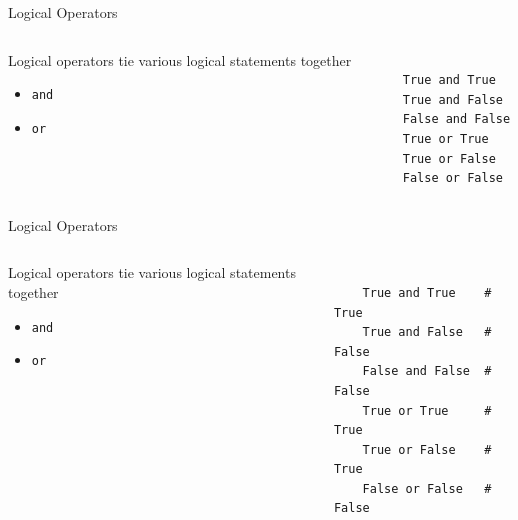 \documentclass{beamer}
\begin{document}
\begin{frame}[fragile]{Logical Operators}
    \begin{columns}
        \begin{column}{0.4\textwidth}
            Logical operators tie various logical statements together
            \begin{itemize}
                \item \texttt{and}
                \item \texttt{or}
            \end{itemize}
        \end{column}
        \begin{column}{0.6\textwidth}
        \small
\begin{verbatim}

    True and True
    True and False
    False and False
    True or True
    True or False
    False or False
\end{verbatim}
        \end{column}
    \end{columns}
\end{frame}

\begin{frame}[fragile]{Logical Operators}
    \begin{columns}
        \begin{column}{0.4\textwidth}
            Logical operators tie various logical statements together
            \begin{itemize}
                \item \texttt{and}
                \item \texttt{or}
            \end{itemize}
        \end{column}
        \begin{column}{0.6\textwidth}
        \small
\begin{verbatim}

    True and True    # True
    True and False   # False
    False and False  # False
    True or True     # True
    True or False    # True
    False or False   # False
\end{verbatim}
        \end{column}
    \end{columns}
\end{frame}
\end{document}
